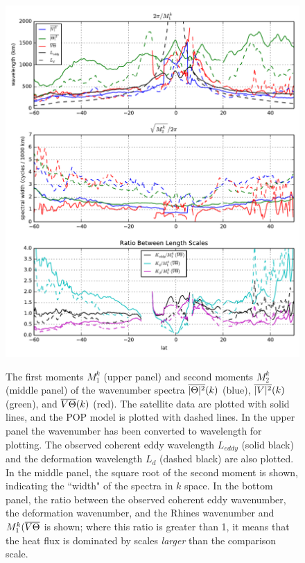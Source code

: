 \documentclass[10pt]{article}
\newcommand{\ol}{\ensuremath{\overline}}
\begin{document}
\begin{figure}[t]
  \noindent\includegraphics{../figures/moments_k.pdf}\\
  \caption{The first moments $M_1^k$ (upper panel) and second moments $M_2^k$ (middle panel) of the wavenumber spectra $\ol{|\Theta|^2}(k)$ (blue), $\ol{|V|^2}(k)$ (green), and $\ol{V\Theta}(k)$ (red). The satellite data are plotted with solid lines, and the POP model is plotted with dashed lines. In the upper panel the wavenumber has been converted to wavelength for plotting. The observed coherent eddy wavelength $L_{eddy}$ (solid black) and the deformation wavelength $L_d$ (dashed black) are also plotted. In the middle panel, the square root of the second moment is shown, indicating the ``width" of the spectra in $k$ space. In the bottom panel, the ratio between the observed coherent eddy wavenumber, the deformation wavenumber, and the Rhines wavenumber and $M_1^k(\ol{V\Theta}$ is shown; where this ratio is greater than 1, it means that the heat flux is dominated by scales {\em larger} than the comparison scale. }
  \label{fig:moments_k}
\end{figure}
\end{document}
